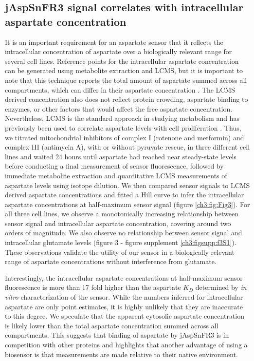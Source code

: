 \subsection{jAspSnFR3 signal correlates with intracellular aspartate concentration}
It is an important requirement for an aspartate sensor that it reflects the intracellular concentration of aspartate over a biologically relevant range for several cell lines.
Reference points for the intracellular aspartate concentration can be generated using metabolite extraction and LCMS, but it is important to note that this technique reports the total amount of aspartate summed across all compartments, which can differ in their aspartate concentration \cite{Chen2016-mf}.
The LCMS derived concentration also does not reflect protein crowding, aspartate binding to enzymes, or other factors that would affect the free aspartate concentration.
Nevertheless, LCMS is the standard approach in studying metabolism and has previously been used to correlate aspartate levels with cell proliferation \cite{Gui2016-ca, Hart2023-gp}.
Thus, we titrated mitochondrial inhibitors of complex I (rotenone and metformin) and complex III (antimycin A), with or without pyruvate rescue, in three different cell lines and waited 24 hours until aspartate had reached near steady-state levels before conducting a final measurement of sensor fluorescence, followed by immediate metabolite extraction and quantitative LCMS measurements of aspartate levels using isotope dilution.
We then compared sensor signals to LCMS derived aspartate concentrations and fitted a Hill curve to infer the intracellular aspartate concentrations at half-maximum sensor signal (figure \ref{ch3:fig:Fig3}).
For all three cell lines, we observe a monotonically increasing relationship between sensor signal and intracellular aspartate concentration, covering around two orders of magnitude.
We also observe no relationship between sensor signal and intracellular glutamate levels (figure 3 - figure supplement \ref{ch3:figsupp:f3S1}).
These observations validate the utility of our sensor in a biologically relevant range of aspartate concentrations without interference from glutamate.

Interestingly, the intracellular aspartate concentrations at half-maximum sensor fluorescence is more than 17 fold higher than the aspartate $K_D$ determined by \textit{in vitro} characterization of the sensor.
While the numbers inferred for intracellular aspartate are only point estimates, it is highly unlikely that they are inaccurate to this degree. 
We speculate that the apparent cytosolic aspartate concentration is likely lower than the total aspartate concentration summed across all compartments.
This suggests that binding of aspartate by jAspSnFR3 is in competition with other proteins and highlights that another advantage of using a biosensor is that measurements are made relative to their native environment.

